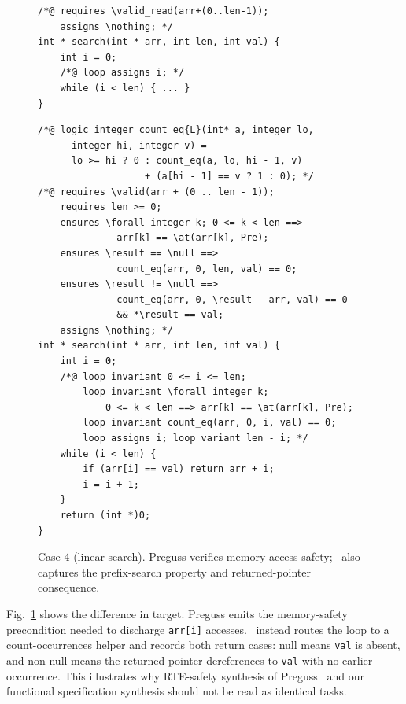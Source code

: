 \begin{figure}[!t]
  \centering
  \begin{tcolorbox}[casebox, title={Preguss: RTE-guided safety specification}, width=0.96\linewidth]
\begin{lstlisting}[style=casecompactinnerstyle]
/*@ requires \valid_read(arr+(0..len-1));
    assigns \nothing; */
int * search(int * arr, int len, int val) {
    int i = 0;
    /*@ loop assigns i; */
    while (i < len) { ... }
}
\end{lstlisting}
  \end{tcolorbox}
  \vspace{1.4ex}

  \begin{tcolorbox}[casebox, title={\toolname: verifier-checked prefix-search specification}, width=0.96\linewidth]
\begin{lstlisting}[style=casecompactinnerstyle]
/*@ logic integer count_eq{L}(int* a, integer lo,
      integer hi, integer v) =
      lo >= hi ? 0 : count_eq(a, lo, hi - 1, v)
                   + (a[hi - 1] == v ? 1 : 0); */
/*@ requires \valid(arr + (0 .. len - 1));
    requires len >= 0;
    ensures \forall integer k; 0 <= k < len ==>
              arr[k] == \at(arr[k], Pre);
    ensures \result == \null ==>
              count_eq(arr, 0, len, val) == 0;
    ensures \result != \null ==>
              count_eq(arr, 0, \result - arr, val) == 0
              && *\result == val;
    assigns \nothing; */
int * search(int * arr, int len, int val) {
    int i = 0;
    /*@ loop invariant 0 <= i <= len;
        loop invariant \forall integer k;
            0 <= k < len ==> arr[k] == \at(arr[k], Pre);
        loop invariant count_eq(arr, 0, i, val) == 0;
        loop assigns i; loop variant len - i; */
    while (i < len) {
        if (arr[i] == val) return arr + i;
        i = i + 1;
    }
    return (int *)0;
}
\end{lstlisting}
  \end{tcolorbox}
  \caption{Case 4 (linear search). Preguss verifies memory-access safety; \toolname\ also captures the prefix-search property and returned-pointer consequence.}
  \label{fig:case7}
\end{figure}

\DIFaddbegin
Fig.~\ref{fig:case7} shows the difference in target. Preguss emits the memory-safety precondition needed to discharge \texttt{arr[i]} accesses. \toolname\ instead routes the loop to a count-occurrences helper and records both return cases: null means \texttt{val} is absent, and non-null means the returned pointer dereferences to \texttt{val} with no earlier occurrence. This illustrates why RTE-safety synthesis of Preguss~\cite{Wang2025ATO} and our functional specification synthesis should not be read as identical tasks.
\DIFaddend

